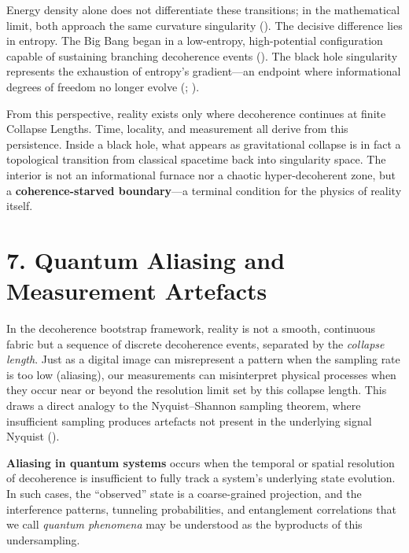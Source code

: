 \documentclass[
]{article}
\begin{document}
Energy density alone does not differentiate these transitions; in the
mathematical limit, both approach the same curvature singularity
(). The
decisive difference lies in entropy. The Big Bang began in a
low-entropy, high-potential configuration capable of sustaining
branching decoherence events (). The black hole singularity represents the exhaustion of
entropy's gradient---an endpoint where informational degrees of freedom
no longer evolve (;
).

From this perspective, reality exists only where decoherence continues
at finite Collapse Lengths. Time, locality, and measurement all derive
from this persistence. Inside a black hole, what appears as
gravitational collapse is in fact a topological transition from
classical spacetime back into singularity space. The interior is not an
informational furnace nor a chaotic hyper-decoherent zone, but a
\textbf{coherence-starved boundary}---a terminal condition for the
physics of reality itself.

\section{7. Quantum Aliasing and Measurement
Artefacts}\label{quantum-aliasing-and-measurement-artefacts}

In the decoherence bootstrap framework, reality is not a smooth,
continuous fabric but a sequence of discrete decoherence events,
separated by the \emph{collapse length}. Just as a digital image can
misrepresent a pattern when the sampling rate is too low (aliasing), our
measurements can misinterpret physical processes when they occur near or
beyond the resolution limit set by this collapse length. This draws a
direct analogy to the Nyquist--Shannon sampling theorem, where
insufficient sampling produces artefacts not present in the underlying
signal Nyquist ().

\textbf{Aliasing in quantum systems} occurs when the temporal or spatial
resolution of decoherence is insufficient to fully track a system's
underlying state evolution. In such cases, the ``observed'' state is a
coarse-grained projection, and the interference patterns, tunneling
probabilities, and entanglement correlations that we call \emph{quantum
phenomena} may be understood as the byproducts of this undersampling.
\end{document}
